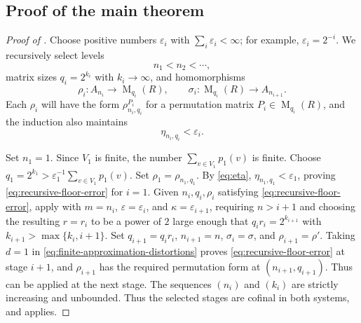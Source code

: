 \documentclass[11pt]{amsart}
\DeclareMathOperator{\Mat}{M}
\theoremstyle{definition}
\theoremstyle{remark}
\begin{document}
\subsection{Proof of the main theorem}

\begin{proof}[Proof of ]
Choose positive numbers $\varepsilon_i$ with $\sum_i\varepsilon_i<\infty$;
for example, $\varepsilon_i=2^{-i}$.
We recursively select levels
\[
  n_1<n_2<\cdots,
\]
matrix sizes $q_i=2^{k_i}$ with $k_i\to\infty$, and homomorphisms
\[
  \rho_i\colon A_{n_i}\longrightarrow \Mat_{q_i}(R),
  \qquad
  \sigma_i\colon \Mat_{q_i}(R)\longrightarrow A_{n_{i+1}}.
\]
Each $\rho_i$ will have the form $\rho_{n_i,q_i}^{P_i}$ for a permutation
matrix $P_i\in\Mat_{q_i}(R)$, and the
induction also maintains
\begin{equation}\label{eq:recursive-floor-error}
 \eta_{n_i,q_i}<\varepsilon_i.
\end{equation}

Set $n_1=1$.  Since $V_1$ is finite, the number $\sum_{v\in V_1}p_1(v)$
is finite.  Choose
$q_1=2^{k_1}>\varepsilon_1^{-1}\sum_{v\in V_1}p_1(v)$.
Set $\rho_1=\rho_{n_1,q_1}$.  By \eqref{eq:eta},
$\eta_{n_1,q_1}<\varepsilon_1$, proving
\eqref{eq:recursive-floor-error} for $i=1$.
Given $n_i,q_i,\rho_i$ satisfying \eqref{eq:recursive-floor-error}, apply
 with $m=n_i$, $\varepsilon=\varepsilon_i$, and
$\kappa=\varepsilon_{i+1}$, requiring $n>i+1$ and choosing the resulting
$r=r_i$ to be a power of $2$ large enough that $q_ir_i=2^{k_{i+1}}$ with
$k_{i+1}>\max\{k_i,i+1\}$.
Set $q_{i+1}=q_ir_i$, $n_{i+1}=n$, $\sigma_i=\sigma$, and
$\rho_{i+1}=\rho'$.
Taking $d=1$ in \eqref{eq:finite-approximation-distortions} proves
\eqref{eq:recursive-floor-error} at stage
$i+1$, and $\rho_{i+1}$ has the required permutation form at
$(n_{i+1},q_{i+1})$.  Thus  can be applied at
the next stage.
The sequences $(n_i)$ and $(k_i)$ are strictly increasing and unbounded.
Thus the selected stages are cofinal in both systems, and
 applies.


\end{proof}
\end{document}
